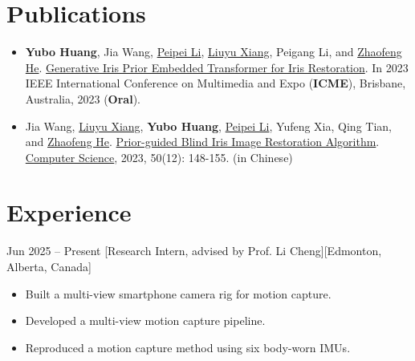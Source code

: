 \documentclass{chicv}
\begin{document}
\section{Publications}

\begin{itemize}
  \item \textbf{Yubo Huang}, Jia Wang, \href{https://teacher.bupt.edu.cn/lipeipei/en/index/241243/list/index.htm}{Peipei Li}, \href{https://teacher.bupt.edu.cn/xiangliuyu/en/lwcg/255396/list/index.htm}{Liuyu Xiang}, Peigang Li, and \href{https://teacher.bupt.edu.cn/hezhaofeng/en/lwcg/206617/list/index.htm}{Zhaofeng He}. \href{https://scholar.google.ca/scholar?q=Generative+Iris+Prior+Embedded+Transformer+for+Iris+Restoration.&hl=en&as_sdt=0&as_vis=1&oi=scholart}{Generative Iris Prior Embedded Transformer for Iris Restoration}. In 2023 IEEE International Conference on Multimedia and Expo (\textbf{ICME}), Brisbane, Australia, 2023 (\textbf{Oral}).
  \item Jia Wang, \href{https://teacher.bupt.edu.cn/xiangliuyu/en/lwcg/255396/list/index.htm}{Liuyu Xiang}, \textbf{Yubo Huang}, \href{https://teacher.bupt.edu.cn/lipeipei/en/index/241243/list/index.htm}{Peipei Li}, Yufeng Xia, Qing Tian, and \href{https://teacher.bupt.edu.cn/hezhaofeng/en/lwcg/206617/list/index.htm}{Zhaofeng He}. \href{https://www.jsjkx.com/EN/Y2023/V50/I12/148}{Prior-guided Blind Iris Image Restoration Algorithm}. \href{https://www.jsjkx.com/EN/1002-137X/home.shtml}{Computer Science}, 2023, 50(12): 148-155. (in Chinese)
\end{itemize}

\section{Experience}

  {Jun 2025 -- Present}
  [Research Intern, advised by Prof. Li Cheng][Edmonton, Alberta, Canada]
  \begin{itemize}
    \item Built a multi-view smartphone camera rig for motion capture.
    \item Developed a multi-view motion capture pipeline.
    \item Reproduced a motion capture method using six body-worn IMUs.
  \end{itemize}
\end{document}
